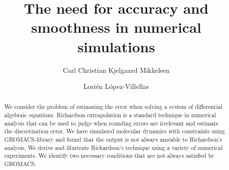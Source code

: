 \documentclass[runningheads]{llncs}
\begin{document}
%
\title{The need for accuracy and smoothness in numerical simulations}
%
%
\author{Carl Christian Kjelgaard Mikkelsen  \and
  Lori{\'e}n L{\'o}pez-Villellas 
}
%
%

%
\maketitle %
%
\begin{abstract} We consider the problem of estimating the error when solving a system of differential algebraic equations. Richardson extrapolation is a standard technique in numerical analysis that can be used to judge when rounding errors are irrelevant and estimate the discretization error. We have simulated molecular dynamics with constraints using GROMACS-library and found that the output is not always ameable to Richardson's analysis. We derive and illustrate Richardson's technique using a variety of numerical experiments. We identify two necessary conditions that are not always satisfied by GROMACS. 
\keywords{}
\end{abstract}
%
%
%
\end{document}
